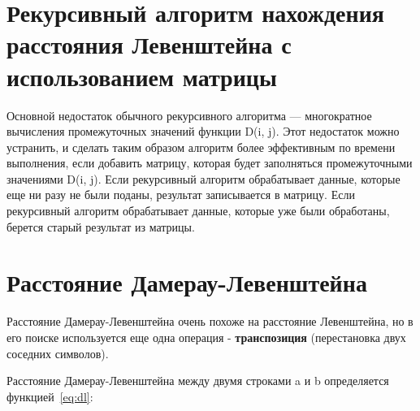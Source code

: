 \documentclass[12pt]{report}
\begin{document}
    \section{Рекурсивный алгоритм нахождения расстояния Левенштейна с использованием матрицы}
    Основной недостаток обычного рекурсивного алгоритма --- многократное вычисления промежуточных значений
    функции D(i, j).
    Этот недостаток можно устранить, и сделать таким образом алгоритм более эффективным по времени выполнения,
    если добавить матрицу, которая будет заполняться промежуточными значениями D(i, j).
    Если рекурсивный алгоритм обрабатывает данные, которые еще ни разу не были поданы, результат
    записывается в матрицу.
    Если рекурсивный алгоритм обрабатывает данные, которые уже были обработаны, берется старый результат из матрицы.


    \section{Расстояние Дамерау-Левенштейна}
    Расстояние Дамерау-Левенштейна очень похоже на расстояние Левенштейна, но в его поиске используется еще одна
    операция - \textbf{транспозиция} (перестановка двух соседних символов).

    Расстояние Дамерау-Левенштейна между двумя строками a и b определяется функцией~\ref{eq:dl}:
\end{document}
